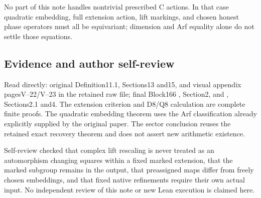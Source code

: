 No part of this note handles nontrivial prescribed C actions. In that
case quadratic embedding, full extension action, lift markings, and
chosen honest phase operators must all be equivariant; dimension and Arf
equality alone do not settle those equations.

\hypertarget{dyadic_markings-evidence-and-author-self-review}{%
\subsection{Evidence and author
self-review}\label{dyadic_markings-evidence-and-author-self-review}}

Read directly: original Definition11.1, Sections13 and15, and visual
appendix pagesV--22/V--23 in the retained raw file; final Block166
, Section2, and , Sections2.1
and4. The extension criterion and D8/Q8 calculation are complete finite
proofs. The quadratic embedding theorem uses the Arf classification
already explicitly supplied by the original paper. The sector conclusion
reuses the retained exact recovery theorem and does not assert new
arithmetic existence.

Self-review checked that complex lift rescaling is never treated as an
automorphism changing squares within a fixed marked extension, that the
marked subgroup remains in the output, that preassigned maps differ from
freely chosen embeddings, and that fixed native refinements require
their own actual input. No independent review of this note or new Lean
execution is claimed here.
